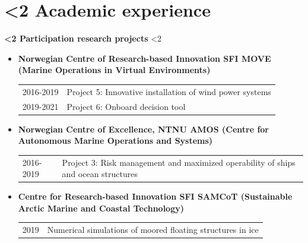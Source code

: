 \documentclass[10pt]{ctexart}
\begin{document}
\vspace{-2em}
\section*{\textbf{\ifnum\value{num}<2 {Academic experience}  \fi}}\vspace{-1.5em}
\textbf{\ifnum\value{num}<2 {Participation research projects}  \fi}\vspace{-1.00em}
\ifnum\value{num}<2 {
    \begin{itemize}[label={}] \setlength\itemsep{0.5em}
    \item \textbf{Norwegian Centre of Research-based Innovation SFI MOVE (Marine Operations in Virtual Environments)}\\
        \begin{tabular}[t]{R{0.15\columnwidth}L{0.8\columnwidth}}
        2016-2019 &  Project 5: Innovative installation of wind power systems\\
        2019-2021 &  Project 6: Onboard decision tool\\
        \end{tabular}%
    \item \textbf{Norwegian Centre of Excellence, NTNU AMOS (Centre for Autonomous Marine Operations and Systems)}
    \begin{tabular}[t]{R{0.15\columnwidth}L{0.8\columnwidth}}
        2016-2019 &  Project 3: Risk management and maximized operability of ships and ocean structures \\
    \end{tabular}%
    \item \textbf{Centre for Research-based Innovation SFI SAMCoT (Sustainable Arctic Marine and Coastal Technology)}\\
    \begin{tabular}[t]{R{0.15\columnwidth}L{0.8\columnwidth}}
        2019 &  Numerical simulations of moored floating structures in ice\\
    \end{tabular}%
    \end{itemize}
}\fi
\vspace*{0.1em}
\end{document}

